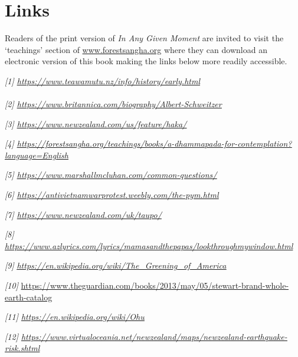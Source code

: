 \chapter{Links}

Readers of the print version of \emph{In Any Given Moment} are invited
to visit the `teachings' section of
\href{http://www.forestsangha.org/}{www.forestsangha.org} where they can
download an electronic version of this book making the links below more
readily accessible.

\emph{{[}1{]}
\href{https://www.teawamutu.nz/info/history/early.html}{\underline{https://www.teawamutu.nz/info/history/early.html}}\\
~\\
{[}2{]}
\href{https://www.britannica.com/biography/Albert-Schweitzer}{\underline{https://www.britannica.com/biography/Albert-Schweitzer}}}

\emph{{[}3{]}
\href{https://www.newzealand.com/us/feature/haka/}{\underline{https://www.newzealand.com/us/feature/haka/}}}

\emph{{[}4{]}
\href{https://forestsangha.org/teachings/books/a-dhammapada-for-contemplation?language=English}{\underline{https://forestsangha.org/teachings/books/a-dhammapada-for-contemplation?language=English}}}

\emph{{[}5{]}
\href{https://www.marshallmcluhan.com/common-questions/}{\underline{https://www.marshallmcluhan.com/common-questions/}}}

\emph{{[}6{]}
\href{https://antivietnamwarprotest.weebly.com/the-pym.html}{\underline{https://antivietnamwarprotest.weebly.com/the-pym.html}}}

\emph{{[}7{]} \underline{https://www.newzealand.com/uk/taupo/}}

\emph{{[}8{]}
\href{https://www.azlyrics.com/lyrics/mamasandthepapas/lookthroughmywindow.html}{\underline{https://www.azlyrics.com/lyrics/mamasandthepapas/lookthroughmywindow.html}}}

\emph{{[}9{]}}
\href{https://en.wikipedia.org/wiki/The_Greening_of_America}{\emph{\underline{https://en.wikipedia.org/wiki/The\_Greening\_of\_America}}}

\emph{{[}10{]}}
\url{https://www.theguardian.com/books/2013/may/05/stewart-brand-whole-earth-catalog}

\emph{{[}11{]}
\href{https://en.wikipedia.org/wiki/Ohu}{\underline{https://en.wikipedia.org/wiki/Ohu}}}

\emph{{[}12{]}
\href{https://www.virtualoceania.net/newzealand/maps/newzealand-earthquake-risk.shtml}{\underline{https://www.virtualoceania.net/newzealand/maps/newzealand-earthquake-risk.shtml}}}

